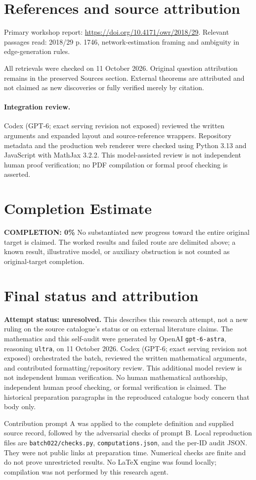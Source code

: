 \documentclass[11pt]{article}
\begin{document}
\section{References and source attribution}
Primary workshop report: \url{https://doi.org/10.4171/owr/2018/29}. Relevant passages read: 2018/29 p. 1746, network-estimation framing and ambiguity in edge-generation rules.

All retrievals were checked on 11 October 2026. Original question attribution remains in the preserved Sources section. External theorems are attributed and not claimed as new discoveries or fully verified merely by citation.


\paragraph{Integration review.} Codex (GPT-6; exact serving revision not exposed) reviewed the written arguments and expanded layout and source-reference wrappers. Repository metadata and the production web renderer were checked using Python 3.13 and JavaScript with MathJax 3.2.2. This model-assisted review is not independent human proof verification; no PDF compilation or formal proof checking is asserted.

\section{Completion Estimate}
\noindent\textbf{COMPLETION: 0\%}
No substantiated new progress toward the entire original target is claimed. The worked results and failed route are delimited above; a known result, illustrative model, or auxiliary obstruction is not counted as original-target completion.

\section{Final status and attribution}
\textbf{Attempt status: unresolved.} This describes this research attempt, not a new ruling on the source catalogue's status or on external literature claims.
The mathematics and this self-audit were generated by OpenAI \texttt{gpt-6-astra}, reasoning \texttt{ultra}, on 11 October 2026. Codex (GPT-6; exact serving revision not exposed) orchestrated the batch, reviewed the written mathematical arguments, and contributed formatting/repository review. This additional model review is not independent human verification. No human mathematical authorship, independent human proof checking, or formal verification is claimed. The historical preparation paragraphs in the reproduced catalogue body concern that body only.

Contribution prompt A was applied to the complete definition and supplied source record, followed by the adversarial checks of prompt B. Local reproduction files are \texttt{batch022/checks.py}, \texttt{computations.json}, and the per-ID audit JSON. They were not public links at preparation time. Numerical checks are finite and do not prove unrestricted results. No LaTeX engine was found locally; compilation was not performed by this research agent.
\end{document}
